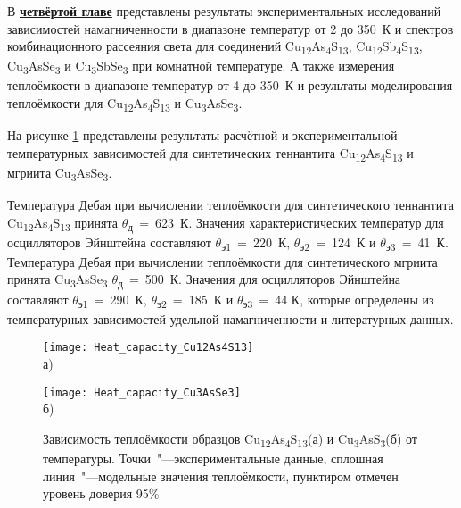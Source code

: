 В \underline{\textbf{четвёртой главе}} представлены результаты экспериментальных исследований зависимостей намагниченности в диапазоне температур от 2 до 350~К и спектров комбинационного рассеяния света для соединений Cu\textsubscript{12}As\textsubscript{4}S\textsubscript{13}, Cu\textsubscript{12}Sb\textsubscript{4}S\textsubscript{13}, Cu\textsubscript{3}AsSe\textsubscript{3} и Cu\textsubscript{3}SbSe\textsubscript{3} при комнатной температуре. А также измерения теплоёмкости в диапазоне температур от 4 до 350~К и результаты моделирования теплоёмкости для Cu\textsubscript{12}As\textsubscript{4}S\textsubscript{13} и Cu\textsubscript{3}AsSe\textsubscript{3}.

На рисунке \ref{img:figure4} представлены результаты расчётной и экспериментальной температурных зависимостей для синтетических теннантита Cu\textsubscript{12}As\textsubscript{4}S\textsubscript{13} и мгриита Cu\textsubscript{3}AsSe\textsubscript{3}.

 Температура Дебая при вычислении теплоёмкости для синтетического теннантита Cu\textsubscript{12}As\textsubscript{4}S\textsubscript{13} принята $\theta$\textsubscript{д}~=~623~К. Значения характеристических температур для осцилляторов Эйнштейна составляют $\theta$\textsubscript{э1}~=~220~К, $\theta$\textsubscript{э2}~=~124~К и $\theta$\textsubscript{э3}~=~41~К.
Температура Дебая при вычислении теплоёмкости для синтетического мгриита принята Cu\textsubscript{3}AsSe\textsubscript{3} $\theta$\textsubscript{д}~=~500~К. Значения для осцилляторов Эйнштейна составляют $\theta$\textsubscript{э1}~=~290~К, $\theta$\textsubscript{э2}~=~185~К и $\theta$\textsubscript{э3}~=~44 К, которые определены из температурных зависимостей удельной намагниченности и литературных данных.

\begin{figure}[ht]
  \begin{minipage}[ht]{0.5\linewidth}\centering
    \texttt{[image: Heat\_capacity\_Cu12As4S13]} \\ а)
  \end{minipage}
  \hfill
  \begin{minipage}[ht]{0.5\linewidth}\centering
    \texttt{[image: Heat\_capacity\_Cu3AsSe3]} \\ б)
  \end{minipage}

      \caption[Зависимость теплоёмкости образцов Cu\textsubscript{12}As\textsubscript{4}S\textsubscript{13}(а) и Cu\textsubscript{3}AsS\textsubscript{3}(б) от температуры. Точки~"---экспериментальные данные, сплошная линия~"---модельные значения теплоёмкости, пунктиром отмечен уровень доверия 95\% ]{Зависимость теплоёмкости образцов Cu\textsubscript{12}As\textsubscript{4}S\textsubscript{13}(а) и Cu\textsubscript{3}AsS\textsubscript{3}(б) от температуры. Точки~"---экспериментальные данные, сплошная линия~"---модельные значения теплоёмкости, пунктиром отмечен уровень доверия 95\%}
    \label{img:figure4}
\end{figure}


